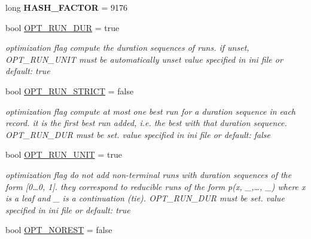 \begin{DoxyCompactItemize}
\mbox{\label{group__general_ga38297772685de12449644c49b20213d3}} 
long {\bfseries H\+A\+S\+H\+\_\+\+F\+A\+C\+T\+OR} = 9176
\item 
\mbox{\label{group__general_ga75258703c393347e8c7af15041e0e7d2}} 
bool \mbox{\hyperlink{group__general_ga75258703c393347e8c7af15041e0e7d2}{O\+P\+T\+\_\+\+R\+U\+N\+\_\+\+D\+UR}} = true
\begin{DoxyCompactList}\small\item\em optimization flag compute the duration sequences of runs. if unset, O\+P\+T\+\_\+\+R\+U\+N\+\_\+\+U\+N\+IT must be automatically unset value specified in ini file or default\+: true \end{DoxyCompactList}\item 
\mbox{\label{group__general_gaf2f921cdceea999adbede3b238fbd924}} 
bool \mbox{\hyperlink{group__general_gaf2f921cdceea999adbede3b238fbd924}{O\+P\+T\+\_\+\+R\+U\+N\+\_\+\+S\+T\+R\+I\+CT}} = false
\begin{DoxyCompactList}\small\item\em optimization flag compute at most one best run for a duration sequence in each record. it is the first best run added, i.\+e. the best with that duration sequence. O\+P\+T\+\_\+\+R\+U\+N\+\_\+\+D\+UR must be set. value specified in ini file or default\+: false \end{DoxyCompactList}\item 
\mbox{\label{group__general_gaf43b37abf039bc3d2e67681387760de6}} 
bool \mbox{\hyperlink{group__general_gaf43b37abf039bc3d2e67681387760de6}{O\+P\+T\+\_\+\+R\+U\+N\+\_\+\+U\+N\+IT}} = true
\begin{DoxyCompactList}\small\item\em optimization flag do not add non-\/terminal runs with duration sequences of the form \mbox{[}0…0, 1\mbox{]}. they correspond to reducible runs of the form p(x, \+\_\+,…, \+\_\+) where x is a leaf and \+\_\+ is a continuation (tie). O\+P\+T\+\_\+\+R\+U\+N\+\_\+\+D\+UR must be set. value specified in ini file or default\+: true \end{DoxyCompactList}\item 
\mbox{\label{group__general_ga4445e6f07c267b6c601d33f1bf23ad2c}} 
bool \mbox{\hyperlink{group__general_ga4445e6f07c267b6c601d33f1bf23ad2c}{O\+P\+T\+\_\+\+N\+O\+R\+E\+ST}} = false

\end{DoxyCompactItemize}
